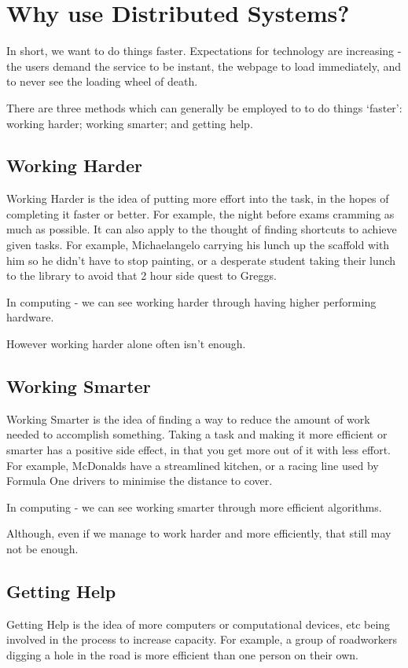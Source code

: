 \section{Why use Distributed Systems?}
In short, we want to do things faster. Expectations for technology are increasing - the users demand the service to be instant, the webpage to load immediately, and to never see the loading wheel of death. 

There are three methods which can generally be employed to to do things `faster': working harder; working smarter; and getting help.

\subsection{Working Harder}
Working Harder is the idea of putting more effort into the task, in the hopes of completing it faster or better. For example, the night before exams cramming as much as possible. It can also apply to the thought of finding shortcuts to achieve given tasks. For example, Michaelangelo carrying his lunch up the scaffold with him so he didn't have to stop painting, or a desperate student taking their lunch to the library to avoid that 2 hour side quest to Greggs. 

In computing - we can see working harder through having higher performing hardware.

However working harder alone often isn't enough.

\subsection{Working Smarter}
Working Smarter is the idea of finding a way to reduce the amount of work needed to accomplish something. Taking a task and making it more efficient or smarter has a positive side effect, in that you get more out of it with less effort. For example, McDonalds have a streamlined kitchen, or a racing line used by Formula One drivers to minimise the distance to cover.

In computing - we can see working smarter through more efficient algorithms.

Although, even if we manage to work harder and more efficiently, that still may not be enough.

\subsection{Getting Help}
Getting Help is the idea of more computers or computational devices, etc being involved in the process to increase capacity. For example, a group of roadworkers digging a hole in the road is more efficient than one person on their own. 

